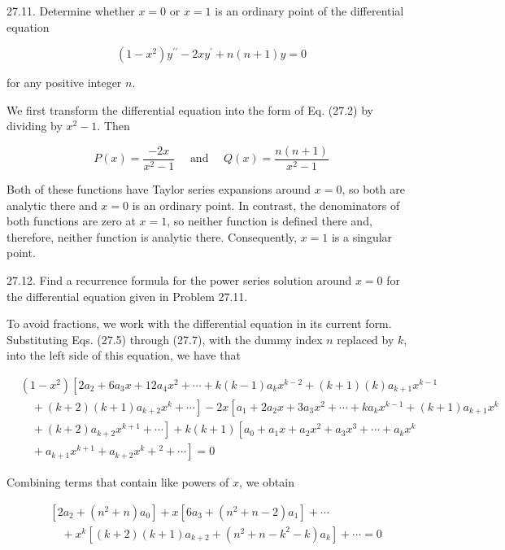 \documentclass[10pt]{article}
\begin{document}
27.11. Determine whether $x=0$ or $x=1$ is an ordinary point of the differential equation

$$
\left(1-x^{2}\right) y^{\prime \prime}-2 x y^{\prime}+n(n+1) y=0
$$

for any positive integer $n$.

We first transform the differential equation into the form of Eq. (27.2) by dividing by $x^{2}-1$. Then

$$
P(x)=\frac{-2 x}{x^{2}-1} \quad \text { and } \quad Q(x)=\frac{n(n+1)}{x^{2}-1}
$$

Both of these functions have Taylor series expansions around $x=0$, so both are analytic there and $x=0$ is an ordinary point. In contrast, the denominators of both functions are zero at $x=1$, so neither function is defined there and, therefore, neither function is analytic there. Consequently, $x=1$ is a singular point.

27.12. Find a recurrence formula for the power series solution around $x=0$ for the differential equation given in Problem 27.11.

To avoid fractions, we work with the differential equation in its current form. Substituting Eqs. (27.5) through (27.7), with the dummy index $n$ replaced by $k$, into the left side of this equation, we have that

$$
\begin{aligned}
& \left(1-x^{2}\right)\left[2 a_{2}+6 a_{3} x+12 a_{4} x^{2}+\cdots+k(k-1) a_{k} x^{k-2}+(k+1)(k) a_{k+1} x^{k-1}\right. \\
& \left.\quad+(k+2)(k+1) a_{k+2} x^{k}+\cdots\right]-2 x\left[a_{1}+2 a_{2} x+3 a_{3} x^{2}+\cdots+k a_{k} x^{k-1}+(k+1) a_{k+1} x^{k}\right. \\
& \left.\quad+(k+2) a_{k+2} x^{k+1}+\cdots\right]+k(k+1)\left[a_{0}+a_{1} x+a_{2} x^{2}+a_{3} x^{3}+\cdots+a_{k} x^{k}\right. \\
& \left.\quad+a_{k+1} x^{k+1}+a_{k+2} x^{k}+{ }^{2}+\cdots\right]=0
\end{aligned}
$$

Combining terms that contain like powers of $x$, we obtain

$$
\begin{aligned}
& {\left[2 a_{2}+\left(n^{2}+n\right) a_{0}\right]+x\left[6 a_{3}+\left(n^{2}+n-2\right) a_{1}\right]+\cdots} \\
& \quad+x^{k}\left[(k+2)(k+1) a_{k+2}+\left(n^{2}+n-k^{2}-k\right) a_{k}\right]+\cdots=0
\end{aligned}
$$
\end{document}
